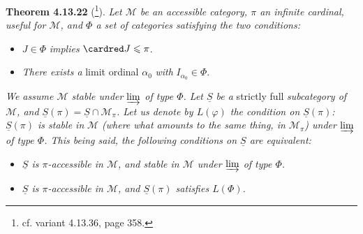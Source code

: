 \textbf{Theorem 4.13.22} (\footnote{cf. variant 4.13.36, page 358.}). \textit{Let $\mathcal{M}$ be an accessible category, $\pi$ an infinite cardinal, useful for $\mathcal{M}$, and $\Phi$ a set of categories satisfying the two conditions:}
\begin{itemize}[leftmargin=2.5em]
\item[\textit{1°)}] $J\in\Phi$ \textit{implies} $\cardred J\leqslant\pi$.
\item[\textit{2°)}] \textit{There exists a} limit ordinal $\alpha_0$ \textit{with} $I_{\alpha_0}\in\Phi$.
\end{itemize}
\textit{We assume $\mathcal{M}$ stable under $\varinjlim$ of type $\Phi$. Let $\underline{S}$ be a} strictly full \textit{subcategory of $\mathcal{M}$, and $\underline{S}(\pi)=\underline{S}\cap\mathcal{M}_\pi$. Let us denote by $L(\varphi)$ the condition on $\underline{S}(\pi)$: $\underline{S}(\pi)$ is stable in} %
\textit{$\mathcal{M}$ (where what amounts to the same thing, in $\mathcal{M}_\pi$) under $\varinjlim$ of type $\Phi$. This being said, the following conditions on $\underline{S}$ are equivalent:} %
\begin{itemize}[leftmargin=2.5em]
\item[\cercle{a}] \textit{$\underline{S}$ is $\pi$-accessible in $\mathcal{M}$, and stable in $\mathcal{M}$ under $\varinjlim$ of type $\Phi$.}
\item[a$'$)] \textit{$\underline{S}$ is $\pi$-accessible in $\mathcal{M}$, and $\underline{S}(\pi)$ satisfies $L(\Phi)$.}
\end{itemize}
